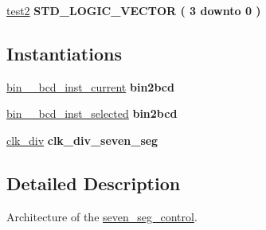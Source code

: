 \begin{DoxyCompactItemize}
\item 
\hypertarget{classseven__seg__control_1_1RTL_aed106e0cd4d13f1b738db8833654822f}{\hyperlink{classseven__seg__control_1_1RTL_aed106e0cd4d13f1b738db8833654822f}{test2} {\bfseries \textcolor{comment}{S\-T\-D\-\_\-\-L\-O\-G\-I\-C\-\_\-\-V\-E\-C\-T\-O\-R}\textcolor{vhdlchar}{ }\textcolor{vhdlchar}{(}\textcolor{vhdlchar}{ }\textcolor{vhdlchar}{ } \textcolor{vhdldigit}{3} \textcolor{vhdlchar}{ }\textcolor{vhdlchar}{ }\textcolor{vhdlchar}{ }\textcolor{vhdlkeyword}{downto}\textcolor{vhdlchar}{ }\textcolor{vhdlchar}{ }\textcolor{vhdlchar}{ } \textcolor{vhdldigit}{0} \textcolor{vhdlchar}{ }\textcolor{vhdlchar}{)}\textcolor{vhdlchar}{ }} }\label{classseven__seg__control_1_1RTL_aed106e0cd4d13f1b738db8833654822f}

\end{DoxyCompactItemize}
\subsection*{Instantiations}
 \begin{DoxyCompactItemize}
\item 
\hypertarget{classseven__seg__control_1_1RTL_a4f65bad50a70c230d8cab7826ca467b3}{\hyperlink{classseven__seg__control_1_1RTL_a4f65bad50a70c230d8cab7826ca467b3}{bin\-\_\-\_\-bcd\-\_\-inst\-\_\-current}  {\bfseries bin2bcd}   }\label{classseven__seg__control_1_1RTL_a4f65bad50a70c230d8cab7826ca467b3}

\item 
\hypertarget{classseven__seg__control_1_1RTL_a175226958b1074f166ae2f0324937b3b}{\hyperlink{classseven__seg__control_1_1RTL_a175226958b1074f166ae2f0324937b3b}{bin\-\_\-\_\-bcd\-\_\-inst\-\_\-selected}  {\bfseries bin2bcd}   }\label{classseven__seg__control_1_1RTL_a175226958b1074f166ae2f0324937b3b}

\item 
\hypertarget{classseven__seg__control_1_1RTL_a39b27375c53f9cfc5759f4a53877ba0b}{\hyperlink{classseven__seg__control_1_1RTL_a39b27375c53f9cfc5759f4a53877ba0b}{clk\-\_\-div}  {\bfseries clk\-\_\-div\-\_\-seven\-\_\-seg}   }\label{classseven__seg__control_1_1RTL_a39b27375c53f9cfc5759f4a53877ba0b}

\end{DoxyCompactItemize}


\subsection{Detailed Description}
Architecture of the \hyperlink{classseven__seg__control}{seven\-\_\-seg\-\_\-control}. 


